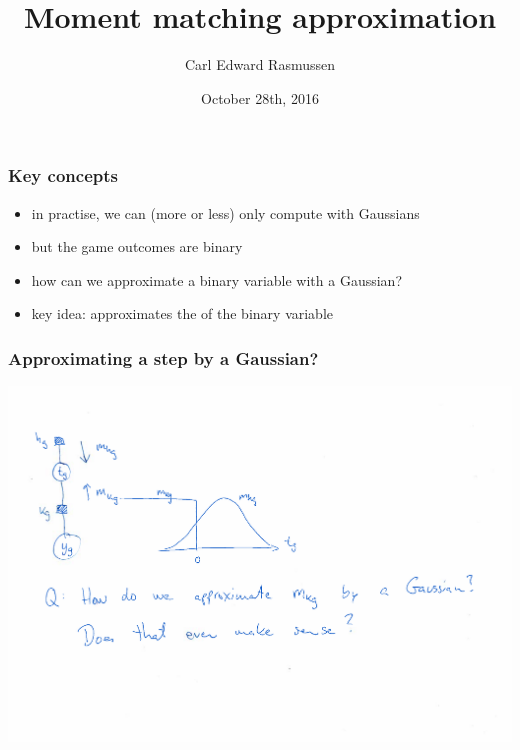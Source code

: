 

\title{Moment matching approximation}
\author{Carl Edward Rasmussen}
\date{October 28th, 2016}




\begin{frame}
\titlepage
\end{frame}


\begin{frame}
\frametitle{Key concepts}

\begin{itemize}
\item in practise, we can (more or less) only compute with Gaussians
\item but the game outcomes are binary
\item how can we approximate a binary variable with a Gaussian?
\item key idea:  approximates the  of
the binary variable
\end{itemize}

\end{frame}

\begin{frame}
\frametitle{Approximating a step by a Gaussian?}

\centerline{\includegraphics[width=\textwidth]{hand}}
\end{frame}


